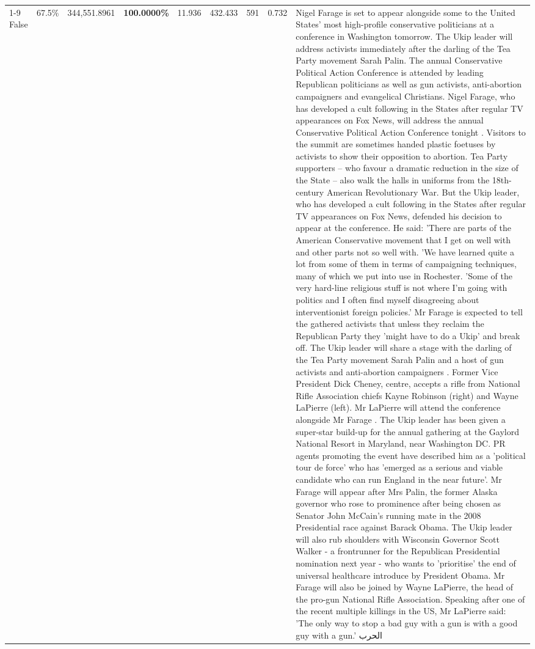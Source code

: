 \begin{table}[H]
\begin{tabular}{lllrlllll}
\cline{1-9}
False & 67.5\% & 344,551.8961 & \bfseries \color{red} 100.0000\% & 11.936 & 432.433 & 591 & 0.732 & Nigel Farage is set to appear alongside some to the United States' most high-profile conservative politicians at a conference in Washington tomorrow. The Ukip leader will address activists immediately after the darling of the Tea Party movement Sarah Palin. The annual Conservative Political Action Conference is attended by leading Republican politicians as well as gun activists, anti-abortion campaigners and evangelical Christians. Nigel Farage, who has developed a cult following in the States after regular TV appearances on Fox News, will address the annual Conservative Political Action Conference tonight . Visitors to the summit are sometimes handed plastic foetuses by activists to show their opposition to abortion. Tea Party supporters – who favour a dramatic reduction in the size of the State – also walk the halls in uniforms from the 18th-century American Revolutionary War. But the Ukip leader, who has developed a cult following in the States after regular TV appearances on Fox News, defended his decision to appear at the conference. He said: 'There are parts of the American Conservative movement that I get on well with and other parts not so well with. 'We have learned quite a lot from some of them in terms of campaigning techniques, many of which we put into use in Rochester. 'Some of the very hard-line religious stuff is not where I'm going with politics and I often find myself disagreeing about interventionist foreign policies.' Mr Farage is expected to tell the gathered activists that unless they reclaim the Republican Party they 'might have to do a Ukip' and break off. The Ukip leader will share a stage with the darling of the Tea Party movement Sarah Palin and a host of gun activists and anti-abortion campaigners . Former Vice President Dick Cheney, centre, accepts a rifle from National Rifle Association chiefs Kayne Robinson (right) and Wayne LaPierre (left). Mr LaPierre will attend the conference alongside Mr Farage . The Ukip leader has been given a super-star build-up for the annual gathering at the Gaylord National Resort in Maryland, near Washington DC. PR agents promoting the event have described him as a 'political tour de force' who has 'emerged as a serious and viable candidate who can run England in the near future'. Mr Farage will appear after Mrs Palin, the former Alaska governor who rose to prominence after being chosen as Senator John McCain's running mate in the 2008 Presidential race against Barack Obama. The Ukip leader will also rub shoulders with Wisconsin Governor Scott Walker - a frontrunner for the Republican Presidential nomination next year - who wants to 'prioritise' the end of universal healthcare introduce by President Obama. Mr Farage will also be joined by Wayne LaPierre, the head of the pro-gun National Rifle Association. Speaking after one of the recent multiple killings in the US, Mr LaPierre said: 'The only way to stop a bad guy with a gun is with a good guy with a gun.' الحرب \\

\end{tabular}
\end{table}
